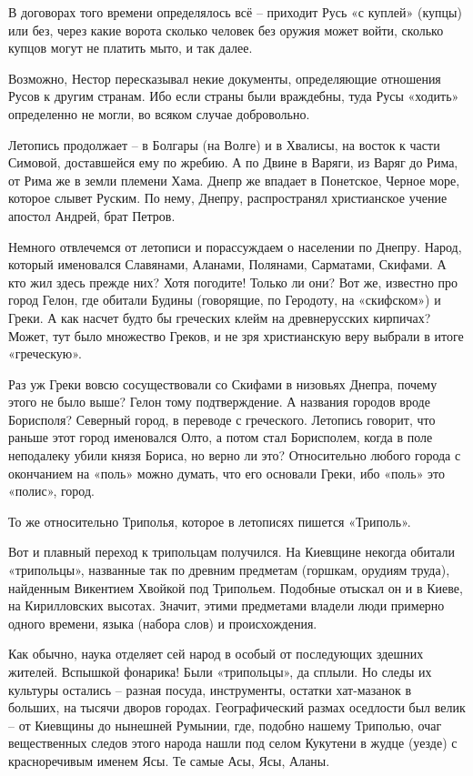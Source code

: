 В договорах того времени определялось всё – приходит Русь «с куплей» (купцы) или без, через какие ворота сколько человек без оружия может войти, сколько купцов могут не платить мыто, и так далее.

Возможно, Нестор пересказывал некие документы, определяющие отношения Русов к другим странам. Ибо если страны были враждебны, туда Русы «ходить» определенно не могли, во всяком случае добровольно.

Летопись продолжает – в Болгары (на Волге) и в Хвалисы, на восток к части Симовой, доставшейся ему по жребию. А по Двине в Варяги, из Варяг до Рима, от Рима же в земли племени Хама. Днепр же впадает в Понетское, Черное море, которое слывет Руским. По нему, Днепру, распространял христианское учение апостол Андрей, брат Петров.

Немного отвлечемся от летописи и порассуждаем о населении по Днепру. Народ, который именовался Славянами, Аланами, Полянами, Сарматами, Скифами. А кто жил здесь прежде них? Хотя погодите! Только ли они? Вот же, известно про город Гелон, где обитали Будины (говорящие, по Геродоту, на «скифском») и Греки. А как насчет будто бы греческих клейм на древнерусских кирпичах? Может, тут было множество Греков, и не зря христианскую веру выбрали в итоге «греческую». 

Раз уж Греки вовсю сосуществовали со Скифами в низовьях Днепра, почему этого не было выше? Гелон тому подтверждение. А названия городов вроде Борисполя? Северный город, в переводе с греческого. Летопись говорит, что раньше этот город именовался Олто, а потом стал Борисполем, когда в поле неподалеку убили князя Бориса, но верно ли это? Относительно любого города с окончанием на «поль» можно думать, что его основали Греки, ибо «поль» это «полис», город.

То же относительно Триполья, которое в летописях пишется «Триполь».

Вот и плавный переход к трипольцам получился. На Киевщине некогда обитали «трипольцы», названные так по древним предметам (горшкам, орудиям труда), найденным Викентием Хвойкой под Трипольем. Подобные отыскал он и в Киеве, на Кирилловских высотах. Значит, этими предметами владели люди примерно одного времени, языка (набора слов) и происхождения.

Как обычно, наука отделяет сей народ в особый от последующих здешних жителей. Вспышкой фонарика! Были «трипольцы», да сплыли. Но следы их культуры остались – разная посуда, инструменты, остатки хат-мазанок в больших, на тысячи дворов городах. Географический размах оседлости был велик – от Киевщины до нынешней Румынии, где, подобно нашему Триполью, очаг вещественных следов этого народа нашли под селом Кукутени в жудце (уезде) с красноречивым именем Ясы. Те самые Асы, Ясы, Аланы.

